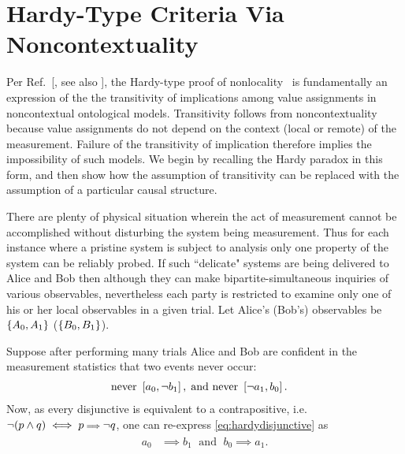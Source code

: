 \section{Hardy-Type Criteria Via Noncontextuality}

Per Ref.~[\citealp[]{LSW}, see also \citealp[]{H.Stapp:Hardy:Transitivity,D.Boschi:PRL:2755,Mermin,Unruh}], the Hardy-type proof of nonlocality~\cite{L.Hardy:PRL:1665} is fundamentally an expression of the the transitivity of implications among value assignments in noncontextual ontological models. Transitivity follows from noncontextuality because value assignments do not depend on the context (local or remote) of the measurement. Failure of the transitivity of implication therefore implies the impossibility of such models. We begin by recalling the Hardy paradox in this form, and then show how the assumption of transitivity can be replaced with the assumption of a particular causal structure. 

There are plenty of physical situation wherein the act of measurement cannot be accomplished without disturbing the system being measurement.  Thus for each instance where a pristine system is subject to analysis only one property of the system can be reliably probed. If such ``delicate" systems are being delivered to Alice and Bob then although they can make bipartite-simultaneous inquiries of various observables, nevertheless each party is restricted to examine only one of his or her local observables in a given trial. Let Alice's (Bob's) observables be $\left\lbrace A_0,A_1\right\rbrace$ ($\left\lbrace B_0,B_1\right\rbrace$).

Suppose after performing many trials Alice and Bob are confident in the measurement statistics that two events never occur:
\begin{align}\begin{split}\label{eq:hardydisjunctive}
\text{never }& \left[a_0,\lnot b_1\right],
\; \text{and never } \left[\lnot a_1,b_0\right].
\end{split}\end{align}
Now, as every disjunctive is equivalent to a contrapositive, i.e.  $\lnot\parens*{p\land q}\iff p {\scriptstyle \implies} \lnot q$, one can re-express \cref{eq:hardydisjunctive} as
\begin{align}\begin{split}\label{eq:hardycontrapositive}
a_0 &{\scriptstyle \implies} b_1
\;\text{ and }\; b_0 {\scriptstyle \implies} a_1.
\end{split}\end{align}

